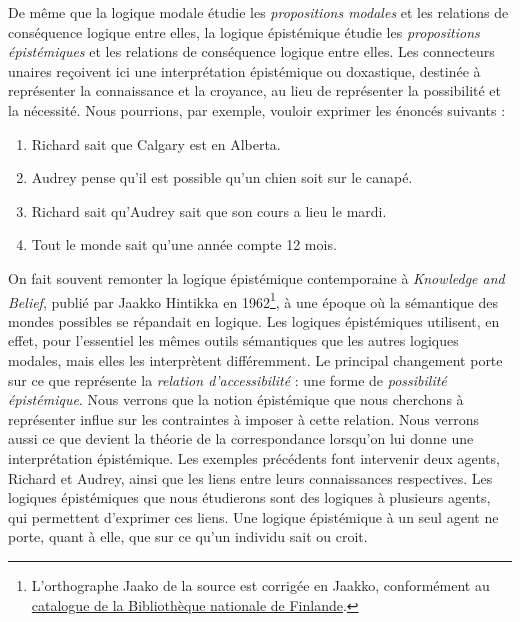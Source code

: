 \documentclass[../../../include/open-logic-section]{subfiles}
\begin{document}


De même que la logique modale étudie les \emph{propositions modales}
et les relations de conséquence logique entre elles, la logique
épistémique étudie les \emph{propositions épistémiques} et les relations
de conséquence logique entre elles. Les connecteurs unaires reçoivent
ici une interprétation épistémique ou doxastique, destinée à représenter
la connaissance et la croyance, au lieu de représenter la possibilité
et la nécessité. Nous pourrions, par exemple, vouloir exprimer les
énoncés suivants :

\begin{enumerate}
\item Richard sait que Calgary est en Alberta.
\item Audrey pense qu'il est possible qu'un chien soit sur le canapé.
\item Richard sait qu'Audrey sait que son cours a lieu le mardi.
\item Tout le monde sait qu'une année compte 12 mois.
\end{enumerate}

On fait souvent remonter la logique épistémique contemporaine à
\emph{Knowledge and Belief}, publié par Jaakko Hintikka en 1962\footnote{L’orthographe Jaako de la source est corrigée en Jaakko, conformément au \href{https://data.nationallibrary.fi/bib/me/W00031358300}{catalogue de la Bibliothèque nationale de Finlande}.}, à une
époque où la sémantique des mondes possibles se répandait en logique.
Les logiques épistémiques utilisent, en effet, pour l'essentiel les
mêmes outils sémantiques que les autres logiques modales, mais elles
les interprètent différemment. Le principal changement porte sur ce
que représente la \emph{relation d'accessibilité} : une forme de
\emph{possibilité épistémique}. Nous verrons que la notion épistémique
que nous cherchons à représenter influe sur les contraintes à imposer
à cette relation. Nous verrons aussi ce que devient la théorie de la
correspondance lorsqu'on lui donne une interprétation épistémique.
Les exemples précédents font intervenir deux agents, Richard et
Audrey, ainsi que les liens entre leurs connaissances respectives.
Les logiques épistémiques que nous étudierons sont des logiques à
plusieurs agents, qui permettent d'exprimer ces liens. Une logique
épistémique à un seul agent ne porte, quant à elle, que sur ce qu'un
individu sait ou croit.
\end{document}
